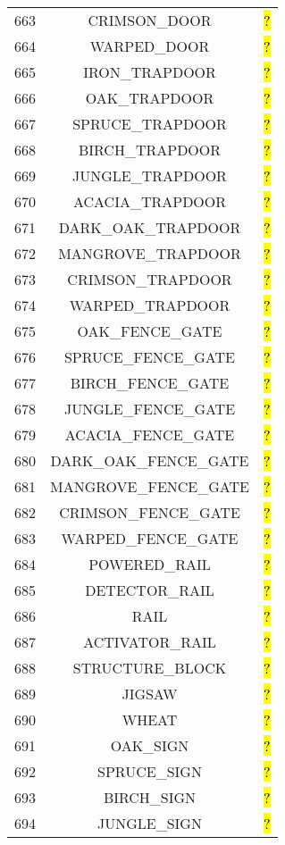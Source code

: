 \documentclass[11pt]{article}
\newcommand\myworries[1]{\sethlcolor{red}\hl{#1}}
\begin{document}
\begin{longtable}{ |c|c|c| }
	663 & CRIMSON\_DOOR & \myworries{?} \\
	664 & WARPED\_DOOR & \myworries{?} \\
	665 & IRON\_TRAPDOOR & \myworries{?} \\
	666 & OAK\_TRAPDOOR & \myworries{?} \\
	667 & SPRUCE\_TRAPDOOR & \myworries{?} \\
	668 & BIRCH\_TRAPDOOR & \myworries{?} \\
	669 & JUNGLE\_TRAPDOOR & \myworries{?} \\
	670 & ACACIA\_TRAPDOOR & \myworries{?} \\
	671 & DARK\_OAK\_TRAPDOOR & \myworries{?} \\
	672 & MANGROVE\_TRAPDOOR & \myworries{?} \\
	673 & CRIMSON\_TRAPDOOR & \myworries{?} \\
	674 & WARPED\_TRAPDOOR & \myworries{?} \\
	675 & OAK\_FENCE\_GATE & \myworries{?} \\
	676 & SPRUCE\_FENCE\_GATE & \myworries{?} \\
	677 & BIRCH\_FENCE\_GATE & \myworries{?} \\
	678 & JUNGLE\_FENCE\_GATE & \myworries{?} \\
	679 & ACACIA\_FENCE\_GATE & \myworries{?} \\
	680 & DARK\_OAK\_FENCE\_GATE & \myworries{?} \\
	681 & MANGROVE\_FENCE\_GATE & \myworries{?} \\
	682 & CRIMSON\_FENCE\_GATE & \myworries{?} \\
	683 & WARPED\_FENCE\_GATE & \myworries{?} \\
	684 & POWERED\_RAIL & \myworries{?} \\
	685 & DETECTOR\_RAIL & \myworries{?} \\
	686 & RAIL & \myworries{?} \\
	687 & ACTIVATOR\_RAIL & \myworries{?} \\
	688 & STRUCTURE\_BLOCK & \myworries{?} \\
	689 & JIGSAW & \myworries{?} \\
	690 & WHEAT & \myworries{?} \\
	691 & OAK\_SIGN & \myworries{?} \\
	692 & SPRUCE\_SIGN & \myworries{?} \\
	693 & BIRCH\_SIGN & \myworries{?} \\
	694 & JUNGLE\_SIGN & \myworries{?} \\

\end{longtable}
\end{document}
